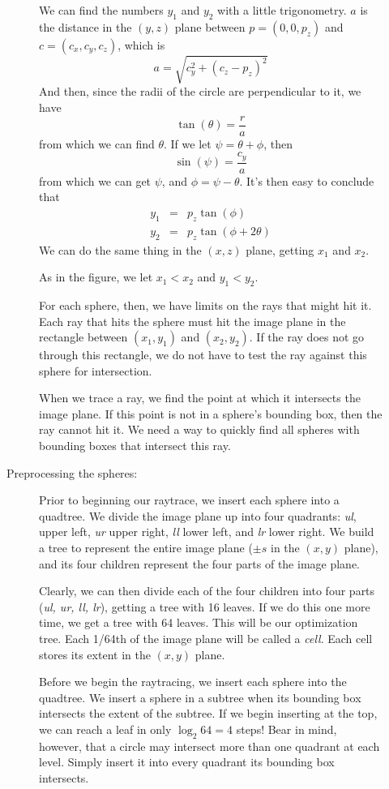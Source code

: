 \documentclass{article}
\begin{document}
\begin{description}
\begin{description}
\begin{figure}
  \end{figure}

We can find the numbers $y_1$ and $y_2$ with a little trigonometry.
$a$ is the distance in the $(y,z)$ plane between $p=(0,0,p_z)$ and $c =
(c_x,c_y,c_z)$, 
which is
\[
a = \sqrt{c_y^2 + (c_z - p_z)^2}
\]
And then, since the radii of the circle are perpendicular to it, we
have
\[
\tan(\theta) = \frac{r}{a}
\]
from which we can find $\theta$.  If we let $\psi = \theta+\phi$, then
\[
\sin(\psi) = \frac{c_y}{a}
\]
from which we can get $\psi$, and $\phi = \psi - \theta$.  It's then
easy to conclude that
\begin{eqnarray*}
  y_1 &=& p_z \tan(\phi)\\
  y_2 &=& p_z \tan(\phi + 2\theta)
\end{eqnarray*}
We can do the same thing in the $(x,z)$ plane, getting $x_1$ and $x_2$.

As in the figure, we let $x_1 < x_2$ and $y_1 < y_2$.

For each sphere, then, we have limits on the rays that might hit it.
Each ray that hits the sphere must hit the image plane in the
rectangle between $(x_1,y_1)$ and $(x_2, y_2)$.  If the ray does not
go through this rectangle, we do not have to test the ray against this
sphere for intersection.

When we trace a ray, we find the point at which it intersects the
image plane.  If this point is not in a sphere's bounding box, then
the ray cannot hit it.  We need a way to quickly find all spheres with
bounding boxes that intersect this ray.

\item[Preprocessing the spheres:]
  Prior to beginning our raytrace, we insert each sphere into a quadtree.
  We divide the image plane up into four quadrants: {\em ul}, upper
  left, {\em ur} upper right, {\em ll} lower left, and {\em lr} lower
  right.  We build a tree to represent the entire image plane ($\pm s$
  in the $(x,y)$ plane), and its four children represent the four parts
  of the image plane.

  Clearly, we can then divide each of the four children into four
  parts ({\em ul, ur, ll, lr}), getting a tree with 16 leaves.  If we
  do this one more time, we get a tree with 64 leaves.  This will be
  our optimization tree.  Each 1/64th of the image plane will be
  called a {\em cell}.  Each cell stores its extent in the $(x,y)$
  plane. 

  Before we begin the raytracing, we insert each sphere into the
  quadtree.  We insert a sphere in a subtree when its bounding box
  intersects the extent of the subtree.
  If we begin inserting at the top, we can reach a leaf in
  only $\log_2 64 = 4$ steps!  Bear in mind, however, that a circle
  may intersect more than one quadrant at each level.  Simply insert
  it into every quadrant its bounding box intersects.


\end{description}
\end{description}
\end{document}
